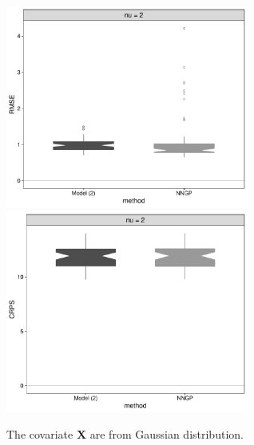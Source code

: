 \documentclass[
12pt, %
a4paper, %
oneside, %
headinclude,footinclude, %
BCOR5mm, %
]{scrartcl}
\begin{document}
      \begin{figure}[H]
    \includegraphics[width= 8cm]{./Figures/simuRMSE_3}
     \includegraphics[width= 8cm]{./Figures/simuCRPS_3}\\
  \caption{The covariate $\boldsymbol{X}$ are from Gaussian distribution.}
      \label{fgr:simulat2}
    \end{figure}
\end{document}
